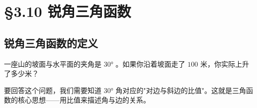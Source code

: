\chapter{§3.10 锐角三角函数}
\label{sec:3.10}





\section*{锐角三角函数的定义}


\begin{explore}


一座山的坡面与水平面的夹角是 $30°$ 。如果你沿着坡面走了 $100$ 米，你实际上升了多少米？

要回答这个问题，我们需要知道 $30°$ 角对应的"对边与斜边的比值"。这就是三角函数的核心思想——用比值来描述角与边的关系。

\end{explore}

